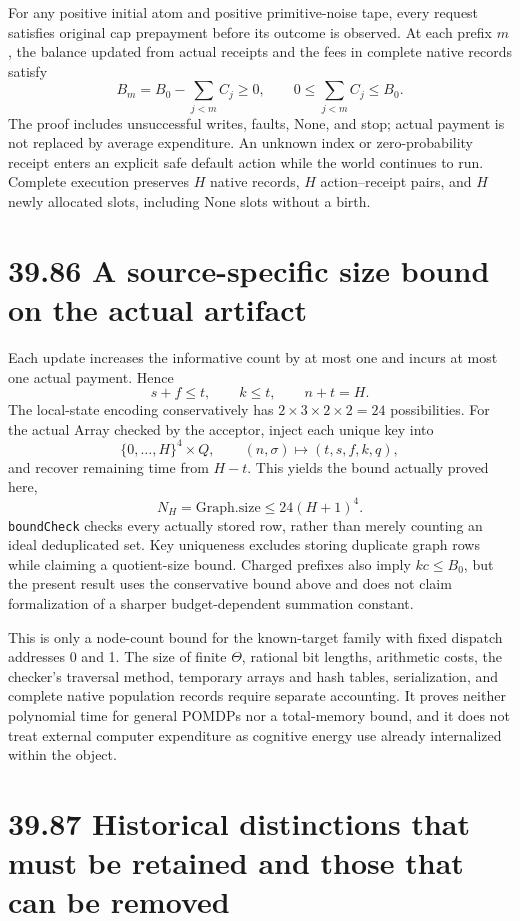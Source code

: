 \documentclass[
  english,
  11pt,
  oneside]{book}
\begin{document}
For any positive initial atom and positive primitive-noise tape, every request satisfies original cap prepayment before its outcome is observed. At each prefix \(m\), the balance updated from actual receipts and the fees in complete native records satisfy \[B_m=B_0-\sum_{j<m}C_j\ge0,\qquad 0\le\sum_{j<m}C_j\le B_0.\] The proof includes unsuccessful writes, faults, None, and stop; actual payment is not replaced by average expenditure. An unknown index or zero-probability receipt enters an explicit safe default action while the world continues to run. Complete execution preserves \(H\) native records, \(H\) action--receipt pairs, and \(H\) newly allocated slots, including None slots without a birth.

\section{39.86 A source-specific size bound on the actual artifact}\label{a-source-specific-size-bound-on-the-actual-artifact}

Each update increases the informative count by at most one and incurs at most one actual payment. Hence \[s+f\le t,\qquad k\le t,\qquad n+t=H.\] The local-state encoding conservatively has \(2\times3\times2\times2=24\) possibilities. For the actual Array checked by the acceptor, inject each unique key into \[\{0,\ldots,H\}^4\times Q,\qquad(n,\sigma)\longmapsto(t,s,f,k,q),\] and recover remaining time from \(H-t\). This yields the bound actually proved here, \[\boxed{N_H=\mathrm{Graph.size}\le24(H+1)^4.}\] \texttt{boundCheck} checks every actually stored row, rather than merely counting an ideal deduplicated set. Key uniqueness excludes storing duplicate graph rows while claiming a quotient-size bound. Charged prefixes also imply \(kc\le B_0\), but the present result uses the conservative bound above and does not claim formalization of a sharper budget-dependent summation constant.

This is only a node-count bound for the known-target family with fixed dispatch addresses 0 and 1. The size of finite \(\Theta\), rational bit lengths, arithmetic costs, the checker's traversal method, temporary arrays and hash tables, serialization, and complete native population records require separate accounting. It proves neither polynomial time for general POMDPs nor a total-memory bound, and it does not treat external computer expenditure as cognitive energy use already internalized within the object.

\section{39.87 Historical distinctions that must be retained and those that can be removed}\label{historical-distinctions-that-must-be-retained-and-those-that-can-be-removed}
\end{document}
